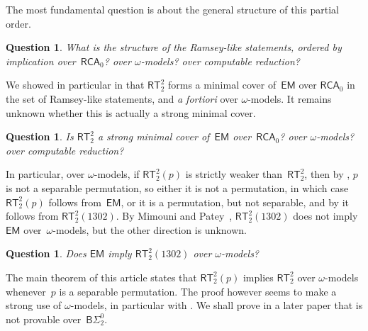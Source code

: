 \documentclass{article}
\numberwithin{theorem}{section}
\newtheorem{question}[theorem]{Question}
\def\L{\mathcal{L}}
\newcommand{\BSig}{\mathsf{B}\Sigma^0}
\newcommand{\RCA}[0]{\mathsf{RCA}}
\newcommand{\EM}[0]{\mathsf{EM}}
\newcommand{\RT}[0]{\mathsf{RT}}
\newcommand{\GP}{\mathsf{GP}}
\newcommand{\NN}[0]{\mathbb{N}}
\begin{document}
The most fundamental question is about the general structure of this partial order.

\begin{question}
What is the structure of the Ramsey-like statements, ordered by implication over~$\RCA_0$? over $\omega$-models? over computable reduction?
\end{question}

We showed in particular in  that $\RT^2_2$ forms a minimal cover of~$\EM$ over $\RCA_0$ in the set of Ramsey-like statements, and \emph{a fortiori} over $\omega$-models. It remains unknown whether this is actually a strong minimal cover. 

\begin{question}
Is $\RT^2_2$ a strong minimal cover of~$\EM$ over~$\RCA_0$? over $\omega$-models? over computable reduction?
\end{question}

In particular, over $\omega$-models, if $\RT^2_2(p)$ is strictly weaker than~$\RT^2_2$, then by , $p$ is not a separable permutation, so either it is not a permutation, in which case $\RT^2_2(p)$ follows from~$\EM$, or it is a permutation, but not separable, and by  it follows from $\RT^2_2(1302)$. By Mimouni and Patey~\cite{mimouni2025ramseylike}, $\RT^2_2(1302)$ does not imply $\EM$ over~$\omega$-models, but the other direction is unknown.

\begin{question}
Does $\EM$ imply $\RT^2_2(1302)$ over $\omega$-models? 
\end{question}



The main theorem of this article states that $\RT^2_2(p)$ implies $\RT^2_2$ over $\omega$-models whenever~$p$ is a separable permutation. The proof however seems to make a strong use of $\omega$-models, in particular with . We shall prove in a later paper that  is not provable over~$\BSig_2$.
\end{document}
